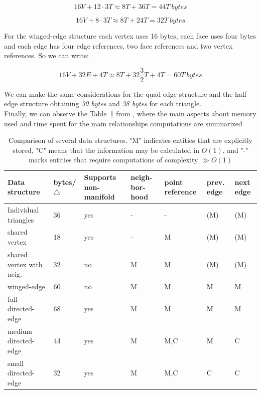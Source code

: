 \begin{equation}
 16V + 12\cdot 3 T \approx 8 T + 36 T = 44 T \: bytes
\end{equation}

\begin{equation}
 16V + 8\cdot 3 T \approx 8 T + 24 T = 32 T \: bytes
\end{equation}

For the winged-edge structure each vertex uses 16 bytes, each face uses four bytes and each edge has four edge references, two face references and two vertex references. So we can write:

\begin{equation}
 16 V + 32 E + 4T \approx 8T + 32 \frac{3}{2}T + 4T = 60T \: bytes
\end{equation}

We can make the same considerations for the quad-edge structure and the half-edge structure obtaining \textit{30 bytes} and \textit{38 bytes} for each triangle.\\

Finally, we can observe the Table~\ref{tbl:meshStructures} from \cite{Campagna}, where the main aspects about memory used and time spent for the main relationships computations are summarized

\begin{table}[htbp]
\centering
\caption[Comparison of several data structures]{Comparison of several data structures. "M" indicates entities that are explicitly stored, "C" means that the information may be calculated in $O(1)$, and "-" marks entities that require computations of complexity $\gg O(1)$}
\label{tbl:meshStructures}
\begin{tabular}{p{4.3cm} || p{1.3cm} | p{1.5cm} | p{1cm} | p{1.2cm} | p{0.8cm} | p{0.8cm}}
\toprule
\textbf{Data structure}	& \textbf{bytes/$\bigtriangleup$}	&\textbf{Supports non-manifold}	&\textbf{neigh-bor-hood}	&\textbf{point reference}	&\textbf{prev. edge}	&\textbf{next edge}\\ \midrule \midrule
Individual triangles              & 36	& yes	&-	&-	&(M)	&(M)\\ \midrule
shared vertex              & 18	& yes	&-	&M	&(M)	&(M)\\ \midrule \midrule
shared vertex with neig.              & 32	& no	&M	&M	&(M)	&(M)\\ \midrule
winged-edge              & 60	& no	&M	&M	&M	&M\\ \midrule \midrule
full directed-edge              & 68	& yes	&M	&M	&M	&M\\ \midrule
medium directed-edge              & 44	& yes	&M	&M,C	&M	&C\\ \midrule
small directed-edge              & 32	& yes	&M	&M,C	&C	&C\\
\bottomrule
\end{tabular}
\end{table}

